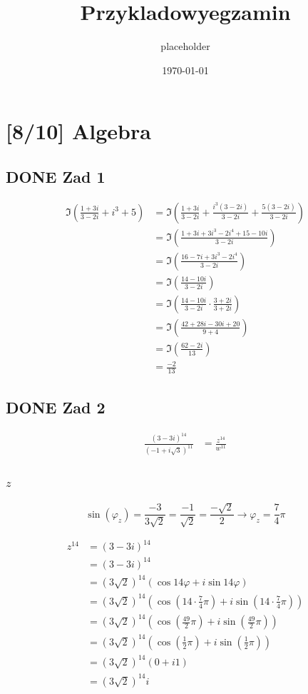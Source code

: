 \documentclass[11pt]{article}
\author{placeholder}
\date{\today}
\title{Przykladowyegzamin}
\begin{document}
\maketitle
\tableofcontents

\section{[8/10] Algebra}
\label{sec:orgfc8b25d}
\subsection{{\bfseries\sffamily DONE} Zad 1}
\label{sec:orga056ef7}
\begin{align*}
\Im \left(\frac{1+3i}{3-2i} + i^{3} + 5\right)
 &=\Im \left(\frac{1+3i}{3-2i} + \frac{i^{3}(3-2i)}{3-2i} + \frac{5(3-2i)}{3-2i}\right)\\
 &= \Im \left(\frac{1+3i + 3i^3 - 2 i^4 + 15 - 10i}{3-2i}\right)\\
 &= \Im \left(\frac{16 - 7i + 3i^{3} -2i^{4}}{3-2i}\right)\\
 &= \Im \left(\frac{14 - 10i}{3-2i}\right)\\
 &= \Im \left(\frac{14 - 10i}{3-2i} \cdot \frac{3+2i}{3+2i}\right)\\
 &= \Im \left(\frac{42 + 28i - 30i + 20}{9 + 4}\right)\\
 &= \Im \left(\frac{62 - 2i }{13}\right)\\
 &= \frac{-2}{13}
\end{align*}
\subsection{{\bfseries\sffamily DONE} Zad 2}
\label{sec:org4c8c1f8}
\begin{align*}
  \frac{ { (3 - 3i)}^{14} }
  { { (-1+i\sqrt{3}) }^{11} }
  &= \frac{z^{14}}{w^{11}}
\end{align*}
\subsubsection{\(z\)}
\label{sec:org713ef66}
$$\sin(\varphi_z) = \frac{-3}{3\sqrt{2}}
 = \frac{-1}{\sqrt{2}}
 = \frac{-\sqrt{2}}{2} \to \varphi_z = \frac{7}{4}\pi$$

\begin{align*}
  z^{14} &= {(3 - 3i)}^{14}\\
  &= {(3-3i)}^{14}\\
  &= {(3\sqrt{2})}^{14}(\cos 14 \varphi + i \sin 14 \varphi)\\
  &= {(3\sqrt{2})}^{14} \left(\cos \left(14 \cdot \frac{7}{4} \pi \right) + i \sin \left(14 \cdot \frac{7}{4} \pi \right) \right)\\
  &= {(3\sqrt{2})}^{14} \left( \cos \left ( \frac{49}{2} \pi \right) + i \sin \left(\frac{49}{2} \pi \right) \right)\\
  &= {(3\sqrt{2})}^{14} \left( \cos \left ( \frac{1}{2} \pi \right) + i \sin \left(\frac{1}{2} \pi \right) \right)\\
  &= {(3\sqrt{2})}^{14} ( 0 + i 1 )\\
  &= {(3\sqrt{2})}^{14}i
\end{align*}
\end{document}
